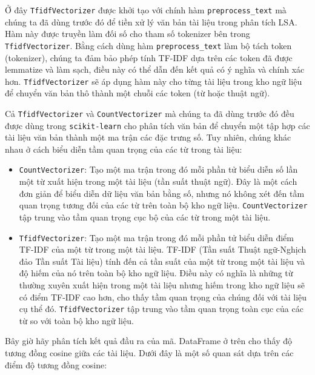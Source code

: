 Ở đây \texttt{TfidfVectorizer} được khởi tạo với chính hàm \texttt{preprocess\_text} mà chúng ta đã dùng trước đó để tiền xử lý văn bản tài liệu trong phân tích LSA. Hàm này được truyền làm đối số cho tham số tokenizer bên trong \texttt{TfidfVectorizer}. Bằng cách dùng hàm \texttt{preprocess\_text} làm bộ tách token (tokenizer), chúng ta đảm bảo phép tính TF-IDF dựa trên các token đã được lemmatize và làm sạch, điều này có thể dẫn đến kết quả có ý nghĩa và chính xác hơn. \texttt{TfidfVectorizer} sẽ áp dụng hàm này cho từng tài liệu trong kho ngữ liệu để chuyển văn bản thô thành một chuỗi các token (từ hoặc thuật ngữ).

Cả \texttt{TfidfVectorizer} và \texttt{CountVectorizer} mà chúng ta đã dùng trước đó đều được dùng trong \texttt{scikit-learn} cho phân tích văn bản để chuyển một tập hợp các tài liệu văn bản thành một ma trận các đặc trưng số. Tuy nhiên, chúng khác nhau ở cách biểu diễn tầm quan trọng của các từ trong tài liệu:

\begin{itemize}
  \item \texttt{CountVectorizer}: Tạo một ma trận trong đó mỗi phần tử biểu diễn số lần một từ xuất hiện trong một tài liệu (tần suất thuật ngữ). Đây là một cách đơn giản để biểu diễn dữ liệu văn bản bằng số, nhưng nó không xét đến tầm quan trọng tương đối của các từ trên toàn bộ kho ngữ liệu. \texttt{CountVectorizer} tập trung vào tầm quan trọng cục bộ của các từ trong một tài liệu.

  \item \texttt{TfidfVectorizer}: Tạo một ma trận trong đó mỗi phần tử biểu diễn điểm TF-IDF của một từ trong một tài liệu. TF-IDF (Tần suất Thuật ngữ-Nghịch đảo Tần suất Tài liệu) tính đến cả tần suất của một từ trong một tài liệu và độ hiếm của nó trên toàn bộ kho ngữ liệu. Điều này có nghĩa là những từ thường xuyên xuất hiện trong một tài liệu nhưng hiếm trong kho ngữ liệu sẽ có điểm TF-IDF cao hơn, cho thấy tầm quan trọng của chúng đối với tài liệu cụ thể đó. \texttt{TfidfVectorizer} tập trung vào tầm quan trọng toàn cục của các từ so với toàn bộ kho ngữ liệu.
\end{itemize}

Bây giờ hãy phân tích kết quả đầu ra của mã. DataFrame ở trên cho thấy độ tương đồng cosine giữa các tài liệu. Dưới đây là một số quan sát dựa trên các điểm độ tương đồng cosine:

